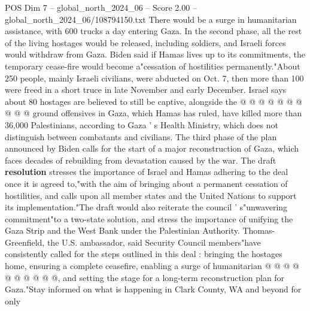 \begin{textsample}{POS Dim 7 – global\_north\_2024\_06 – Score 2.00 – global\_north\_2024\_06/108794150.txt}
There would be a surge in humanitarian assistance, with 600 trucks a day entering Gaza.
In the second phase, all the rest of the living hostages would be released, including soldiers, and Israeli forces would withdraw from Gaza.
Biden said if Hamas lives up to its commitments, the temporary cease-fire would become a"cessation of hostilities permanently."About 250 people, mainly Israeli civilians, were abducted on Oct. 7, then more than 100 were freed in a short truce in late November and early December.
Israel says about 80 hostages are believed to still be captive, alongside the @ @ @ @ @ @ @ @ @ @ ground offensives in Gaza, which Hamas has ruled, have killed more than 36,000 Palestinians, according to Gaza ' s Health Ministry, which does not distinguish between combatants and civilians.
The third phase of the plan announced by Biden calls for the start of a major reconstruction of Gaza, which faces decades of rebuilding from devastation caused by the war.
The draft \textbf{resolution} stresses the importance of Israel and Hamas adhering to the deal once it is agreed to,"with the aim of bringing about a permanent cessation of hostilities, and calls upon all member states and the United Nations to support its implementation."The draft would also reiterate the council ' s"unwavering commitment"to a two-state solution, and stress the importance of unifying the Gaza Strip and the West Bank under the Palestinian Authority.
Thomas-Greenfield, the U.S. ambassador, said Security Council members"have consistently called for the steps outlined in this deal : bringing the hostages home, ensuring a complete ceasefire, enabling a surge of humanitarian @ @ @ @ @ @ @ @ @ @, and setting the stage for a long-term reconstruction plan for Gaza."Stay informed on what is happening in Clark County, WA and beyond for only

\end{textsample}
